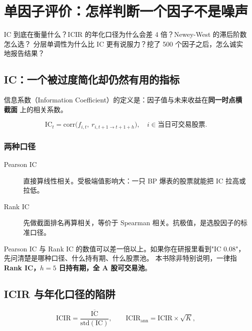 \chapter{单因子评价：怎样判断一个因子不是噪声}\label{ch:eval}

\begin{keybox}[本章要回答的问题]
IC 到底在衡量什么？ICIR 的年化口径为什么会差 4 倍？Newey-West 的滞后阶数怎么选？
分层单调性为什么比 IC 更有说服力？挖了 500 个因子之后，怎么诚实地报告结果？
\end{keybox}

\section{IC：一个被过度简化却仍然有用的指标}

信息系数（Information Coefficient）的定义是：因子值与未来收益在\textbf{同一时点横截面}
上的相关系数。

\begin{equation}
  \mathrm{IC}_t = \mathrm{corr}\big(f_{i,t},\ r_{i,t+1\rightarrow t+1+h}\big),
  \quad i \in \text{当日可交易股票}.
\end{equation}

\subsection{两种口径}

\begin{description}
  \item[Pearson IC] 直接算线性相关。受极端值影响大：一只 BP 爆表的股票就能把 IC 拉高或拉低。
  \item[Rank IC] 先做截面排名再算相关，等价于 Spearman 相关。抗极值，是选股因子的标准口径。
\end{description}

\begin{warnbox}[不要在同一个研究里混用两种口径]
Pearson IC 与 Rank IC 的数值可以差一倍以上。如果你在研报里看到"IC 0.08"，
先问清楚是哪种口径、什么持有期、什么股票池。
本书除非特别说明，一律指 \textbf{Rank IC，$h=5$ 日持有期，全 A 股可交易池}。
\end{warnbox}

\section{ICIR 与年化口径的陷阱}

\begin{equation}
  \mathrm{ICIR} = \frac{\overline{\mathrm{IC}}}{\mathrm{std}(\mathrm{IC})},
  \qquad
  \mathrm{ICIR}_{\mathrm{ann}} = \mathrm{ICIR}\times\sqrt{K},
\end{equation}

